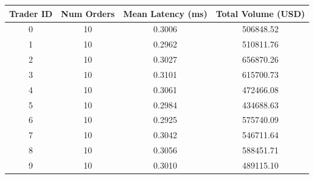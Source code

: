 \begin{tabular}{cccc}
\hline
Trader ID & Num Orders & Mean Latency (ms) & Total Volume (USD) \\
\hline
0 & 10 & 0.3006 & 506848.52 \\
1 & 10 & 0.2962 & 510811.76 \\
2 & 10 & 0.3027 & 656870.26 \\
3 & 10 & 0.3101 & 615700.73 \\
4 & 10 & 0.3061 & 472466.08 \\
5 & 10 & 0.2984 & 434688.63 \\
6 & 10 & 0.2925 & 575740.09 \\
7 & 10 & 0.3042 & 546711.64 \\
8 & 10 & 0.3056 & 588451.71 \\
9 & 10 & 0.3010 & 489115.10 \\
\hline
\end{tabular}
